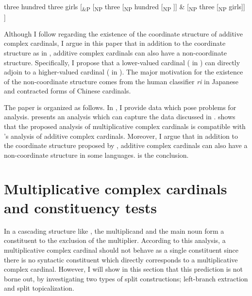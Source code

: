 \documentclass[output=paper]{langscibook}
\begin{document}
\ea
\ea three hundred three girls
\ex\label{tat:cord} {[}\textsubscript{\&P} [\textsubscript{NP} three [\textsubscript{NP} hundred [\textsubscript{NP} ]] \& [\textsubscript{NP} three [\textsubscript{NP} girls]] ]\\\hfill \citep{IoninMatushansky2018}
\z\z

\noindent Although I follow \citet{IoninMatushansky2018} regarding the existence of the coordinate structure of additive complex cardinals, I argue in this paper that in addition to the coordinate structure as in , additive complex cardinals can also have a non-coordinate structure. Specifically, I propose that a lower-valued cardinal ( in ) can directly adjoin to a higher-valued cardinal ( in ). The major motivation for the existence of the non-coordinate structure comes from the human classifier \textit{ri} in Japanese and contracted forms of Chinese cardinals.

The paper is organized as follows. In , I provide data which pose problems for  analysis.  presents an analysis which can capture the data discussed in .  shows that the proposed analysis of multiplicative complex cardinals is compatible with \citeauthor{IoninMatushansky2018}'s analysis of additive complex cardinals. Moreover, I argue that in addition to the coordinate structure proposed by \citeauthor{IoninMatushansky2018}, additive complex cardinals can also have a non-coordinate structure in some languages.  is the conclusion.

\section{Multiplicative complex cardinals and constituency tests}\label{tat:sec:mul.const}
In a cascading structure like , the multiplicand and the main noun form a constituent to the exclusion of the multiplier. According to this analysis, a multiplicative complex cardinal should not behave as a single constituent since there is no syntactic constituent which directly corresponds to a multiplicative complex cardinal. However, I will show in this section that this prediction is not borne out, by investigating two types of split constructions; left-branch extraction and split topicalization. 
\end{document}
